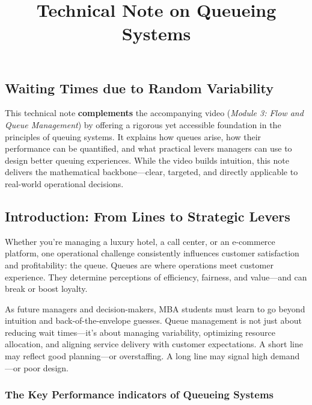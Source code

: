 \documentclass[
  letterpaper,
  DIV=11,
  numbers=noendperiod]{scrartcl}
\title{Technical Note on Queueing Systems}
\author{}
\date{}
\begin{document}
\maketitle


\subsection{\texorpdfstring{\textbf{Waiting Times due to Random
Variability}}{Waiting Times due to Random Variability}}\label{waiting-times-due-to-random-variability}

This technical note \textbf{complements} the accompanying video
(\emph{Module 3: Flow and Queue Management}) by offering a rigorous yet
accessible foundation in the principles of queuing systems. It explains
how queues arise, how their performance can be quantified, and what
practical levers managers can use to design better queuing experiences.
While the video builds intuition, this note delivers the mathematical
backbone---clear, targeted, and directly applicable to real-world
operational decisions.

\subsection{\texorpdfstring{\textbf{Introduction: From Lines to
Strategic
Levers}}{Introduction: From Lines to Strategic Levers}}\label{introduction-from-lines-to-strategic-levers}

Whether you're managing a luxury hotel, a call center, or an e-commerce
platform, one operational challenge consistently influences customer
satisfaction and profitability: the queue. Queues are where operations
meet customer experience. They determine perceptions of efficiency,
fairness, and value---and can break or boost loyalty.

As future managers and decision-makers, MBA students must learn to go
beyond intuition and back-of-the-envelope guesses. Queue management is
not just about reducing wait times---it's about managing variability,
optimizing resource allocation, and aligning service delivery with
customer expectations. A short line may reflect good planning---or
overstaffing. A long line may signal high demand---or poor design.

\subsubsection{\texorpdfstring{\textbf{The Key Performance indicators of
Queueing
Systems}}{The Key Performance indicators of Queueing Systems}}\label{the-key-performance-indicators-of-queueing-systems}
\end{document}
